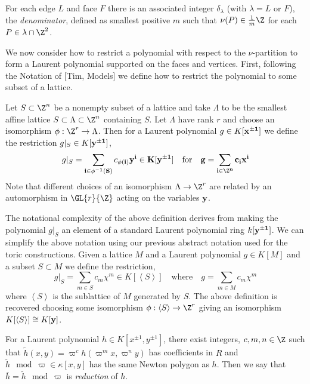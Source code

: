 \begin{defn}
For each edge $L$ and face $F$ there is an associated integer $\delta_\lambda$ (with $\lambda = L$ or $F$), the \textit{denominator}, defined as smallest positive $m$ such that $\nu(P) \in \frac{1}{m} \Z$ for each $P \in \lambda \cap \Z^2$. 
\end{defn}

\begin{rmk}
We now consider how to restrict a polynomial with respect to the $\nu$-partition to form a Laurent polynomial supported on the faces and vertices. First, following the Notation of [Tim, Models] we define how to restrict the polynomial to some subset of a lattice.
\end{rmk}

\begin{defn}[Restriction]
Let $S \subset \Z^n$ be a nonempty subset of a lattice and take $\Lambda$ to be the smallest affine lattice $S \subset \Lambda \subset \Z^n$ containing $S$. Let $\Lambda$ have rank $r$ and choose an isomorphism $\phi : \Z^r \to \Lambda$. Then for a Laurent polynomial $g \in K[\bf{x}^{\pm 1}]$ we define the restriction $g|_S \in K[\bf{y}^{\pm 1}]$,
\[ g|_S = \sum_{\bf{i} \in \phi^{-1}(S)} c_{\phi(\bf{i})} \bf{y}^{\bf{i}} \in K[\bf{y}^{\pm 1}] \quad \text{for} \quad g = \sum_{\bf{i} \in \Z^n} c_{\bf{i}} \bf{x}^{\bf{i}} \]
Note that different choices of an isomorphism $\Lambda \to \Z^r$ are related by an automorphism in $\GL{r}{\Z}$ acting on the variables $\bf{y}$. 
\end{defn}

\begin{rmk}
The notational complexity of the above definition derives from making the polynomial $g|_S$ an element of a standard Laurent polynomial ring $k[\bf{y}^{\pm 1}]$. We can simplify the above notation using our previous abstract notation used for the toric constructions. Given a lattice $M$ and a Laurent polynomial $g \in K[M]$ and a subset $S \subset M$ we define the restriction,
\[ g|_S = \sum_{m \in S} c_m \chi^m \in K[\left< S \right>] \quad \text{where} \quad g = \sum_{m \in M} c_m \chi^m \]
where $\left< S \right>$ is the sublattice of $M$ generated by $S$. The above definition is recovered choosing some isomorphism $\phi : \left< S \right> \to \Z^r$ giving an isomorphism $K[\left< S \right>] \cong K[\bf{y}]$. 
\end{rmk}

\begin{defn}[Reduction]
For a Laurent polynomial $h \in K[x^{\pm 1}, y^{\pm 1}]$, there exist integers, $c, m, n \in \Z$ such that $\tilde{h}(x, y) = \varpi^c h(\varpi^m x, \varpi^n y)$ has coefficients in $R$ and $\tilde{h} \mod \varpi \in \kappa[x, y]$ has the same Newton polygon as $h$. Then we say that $\overline{h} = \tilde{h} \mod \varpi$ is \textit{reduction} of $h$. 
\end{defn}

